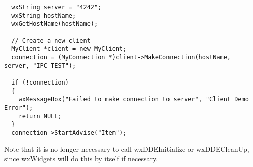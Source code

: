 \begin{verbatim}
  wxString server = "4242";
  wxString hostName;
  wxGetHostName(hostName);

  // Create a new client
  MyClient *client = new MyClient;
  connection = (MyConnection *)client->MakeConnection(hostName, server, "IPC TEST");

  if (!connection)
  {
    wxMessageBox("Failed to make connection to server", "Client Demo Error");
    return NULL;
  }
  connection->StartAdvise("Item");
\end{verbatim}

Note that it is no longer necessary to call wxDDEInitialize or wxDDECleanUp, since
wxWidgets will do this by itself if necessary.


